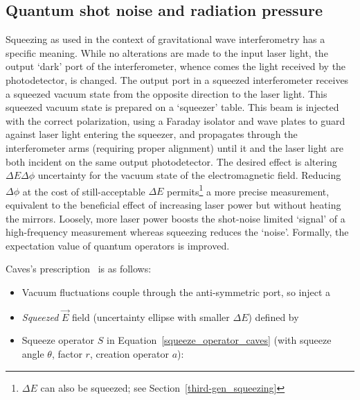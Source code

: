         \subsection{Quantum shot noise and radiation pressure}
        \label{quantum_noise}




Squeezing as used in the context of gravitational wave interferometry has a specific meaning.
While no alterations are made to the input laser light, the output `dark' port of the interferometer, whence comes the light received by the photodetector, is changed.
The output port in a squeezed interferometer receives a squeezed vacuum state from the opposite direction to the laser light.
This squeezed vacuum state is prepared on a `squeezer' table.
This beam is injected with the correct polarization, using a Faraday isolator and wave plates to guard against laser light entering the squeezer, and propagates through the interferometer arms (requiring proper alignment) until it and the laser light are both incident on the same output photodetector.
The desired effect is altering $\Delta E\Delta\phi$ uncertainty for the vacuum state of the electromagnetic field.
Reducing $\Delta \phi$ at the cost of still-acceptable $\Delta E$ permits\footnote{$\Delta E$ can also be squeezed; see Section~\ref{third-gen_squeezing}} a more precise measurement, equivalent to the beneficial effect of increasing laser power but without heating the mirrors.
Loosely, more laser power boosts the shot-noise limited `signal' of a high-frequency measurement whereas squeezing reduces the `noise'. 
Formally, the expectation value of quantum operators is improved.


Caves's prescription~\cite{Caves1981} is as follows:
\begin{itemize}
\item Vacuum fluctuations couple through the anti-symmetric port, so inject a
\item \emph{Squeezed } $\overrightarrow{E}$ field (uncertainty ellipse with smaller $\Delta E$) defined by
\item Squeeze operator $S$ in Equation~\ref{squeeze_operator_caves} (with squeeze angle $\theta$, factor $r$, creation operator $a$):
\end{itemize}

